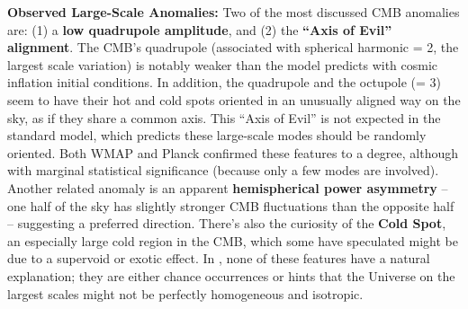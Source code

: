 \documentclass[]{article}
\begin{document}
\textbf{Observed Large-Scale Anomalies:} Two of the most discussed CMB
anomalies are: (1) a \textbf{low quadrupole amplitude}, and (2) the
\textbf{``Axis of Evil'' alignment}. The CMB's quadrupole (associated
with spherical harmonic \ell = 2, the largest scale variation) is notably
weaker than the \LambdaCDM model predicts with cosmic inflation initial
conditions. In addition, the quadrupole and the octupole (\ell = 3) seem to
have their hot and cold spots oriented in an unusually aligned way on
the sky, as if they share a common axis. This ``Axis of Evil'' is not
expected in the standard model, which predicts these large-scale modes
should be randomly oriented. Both WMAP and Planck confirmed these
features to a degree, although with marginal statistical significance
(because only a few modes are involved). Another related anomaly is an
apparent \textbf{hemispherical power asymmetry} -- one half of the sky
has slightly stronger CMB fluctuations than the opposite half --
suggesting a preferred direction. There's also the curiosity of the
\textbf{Cold Spot}, an especially large cold region in the CMB, which
some have speculated might be due to a supervoid or exotic effect. In
\LambdaCDM, none of these features have a natural explanation; they are either
chance occurrences or hints that the Universe on the largest scales
might not be perfectly homogeneous and isotropic.
\end{document}
